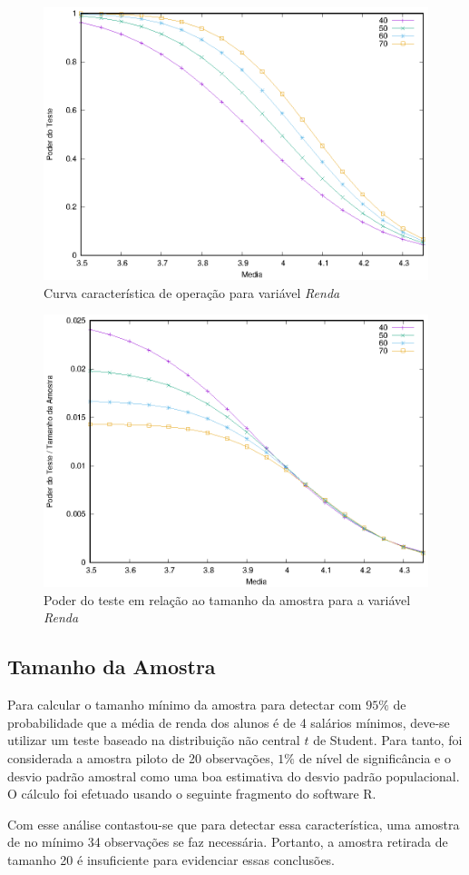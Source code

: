 	\begin{figure}[!h]
		\centering
		\includegraphics[width=0.8\linewidth]{questao2/powers.eps}
		\caption{Curva característica de operação para variável \textit{Renda}}
		\label{figure: poder do teste renda}
	\end{figure}

	\begin{figure}[!h]
		\centering
		\includegraphics[width=0.8\linewidth]{questao2/powers-breakdown.eps}
		\caption{Poder do teste em relação ao tamanho da amostra para a variável \textit{Renda}}
		\label{figure: poder do teste e tamanho da amostra renda}
	\end{figure}

\subsection{Tamanho da Amostra}

	Para calcular o tamanho mínimo da amostra para detectar com $95\%$ de
	probabilidade que a média de renda dos alunos é de 4 salários mínimos,
	deve-se utilizar um teste baseado na distribuição não central $t$ de Student.
	Para tanto, foi considerada a amostra piloto de 20 observações, $1\%$ de
	nível de significância e o desvio padrão amostral como uma boa estimativa do
	desvio padrão populacional. O cálculo foi efetuado usando o seguinte
	fragmento do software R.

	Com esse análise contastou-se que para detectar essa característica, uma
	amostra de no mínimo 34 observações se faz necessária. Portanto, a amostra
	retirada de tamanho 20 é insuficiente para evidenciar essas conclusões.

